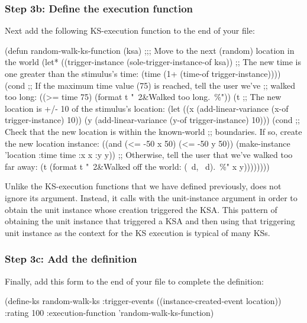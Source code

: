 \documentclass[10pt,twoside,english,pdftex]{article}
\begin{document}
\subsubsection*{Step 3b: Define the  execution function}

Next add the following KS-execution function to the end of your
 file:
%
\W\supp
\begin{example}
  (defun random-walk-ks-function (ksa)
    ;;; Move to the next (random) location in the world
    (let* ((trigger-instance (sole-trigger-instance-of ksa))
           ;; The new time is one greater than the stimulus's time:
           (time (1+ (time-of trigger-instance))))
      (cond
       ;; If the maximum time value (75) is reached, tell the user we've
       ;; walked too long:
       ((>= time 75) (format t "~2&Walked too long.~\%"))
       (t ;; The new location is +/- 10 of the stimulus's location:
        (let ((x (add-linear-variance (x-of trigger-instance) 10))
              (y (add-linear-variance (y-of trigger-instance) 10)))
          (cond
           ;; Check that the new location is within the known-world
           ;; boundaries.  If so, create the new location instance:
           ((and (<= -50 x 50) (<= -50 y 50))
            (make-instance 'location 
              :time time 
              :x x 
              :y y))
           ;; Otherwise, tell the user that we've walked too far away:
           (t (format t "~2\&Walked off the world: (~d, ~d).~\%" x y))))))))
\end{example}

%
%
Unlike the KS-execution functions that we have defined previously,
 does not ignore its  argument.
Instead, it calls  with the 
unit-instance argument in order to obtain the  unit
instance whose creation triggered the KSA.  This pattern of obtaining the unit
instance that triggered a KSA and then using that triggering unit instance as
the context for the KS execution is typical of many KSs.

\subsubsection*{Step 3c: Add the  definition}

Finally, add this  form to the end of your
 file to complete the
 definition:
%
%
%
\W\supp
\begin{example}
  (define-ks random-walk-ks
     :trigger-events ((instance-created-event location))
     :rating 100
     :execution-function 'random-walk-ks-function)
\end{example}
\end{document}
